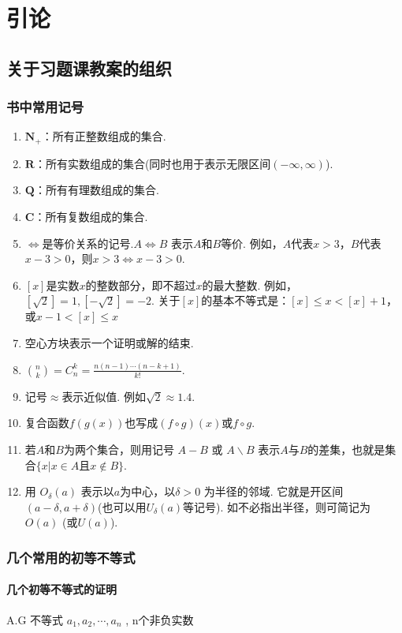 \chapter{引论}
\section{关于习题课教案的组织}
\subsection{书中常用记号}
\begin{enumerate}
	\item $ \mathbf{N}_{+} $：所有正整数组成的集合.
	\item $ \mathbf{R} $：所有实数组成的集合(同时也用于表示无限区间$( -\infty,\infty )$).
	\item $ \mathbf{Q} $：所有有理数组成的集合.
	\item $ \mathbf{C} $：所有复数组成的集合.
	\item $ \iff $是等价关系的记号.$ A\iff B $ 表示$ A $和$ B $等价. 例如，$ A $代表$ x > 3 $，$ B $代表$ x-3>0 $，则$ x>3\iff x-3>0 $.
	\item $ [x] $是实数$ x $的整数部分，即不超过$ x $的最大整数. 例如，$ [\sqrt{2}] = 1, [-\sqrt{2}] = -2 $. 关于$ [x] $的基本不等式是：$ [x]\le x < [x] + 1 $，或$ x-1<[x]\le x $
	\item $  $空心方块表示一个证明或解的结束.
	\item $ {n \choose k} = C_n^k = \frac{n(n-1)\cdots(n-k+1)}{k!}$.
	\item 记号$ \approx $表示近似值. 例如$ \sqrt{2}\approx 1.4 $.
	\item 复合函数$ f(g(x)) $也写成$ (f\circ g)(x) $或$ f \circ g $.
	\item 若$ A $和$ B $为两个集合，则用记号 $ A-B $ 或 $ A \backslash B $ 表示$ A $与$ B $的差集，也就是集合$ \{x|x\in A \text{且} x\notin B\} $.
	\item 用 $ O_\delta (a) $ 表示以$ a $为中心，以$ \delta >0 $ 为半径的邻域. 它就是开区间$ (a-\delta, a+\delta) $(也可以用$ U_\delta (a) $等记号). 如不必指出半径，则可简记为$ O(a)$ (或$ U(a) $).
\end{enumerate}


\subsection{几个常用的初等不等式}
\subsubsection{几个初等不等式的证明}
A.G 不等式 $ a_1,a_2,\cdots,a_n $ , n个非负实数

